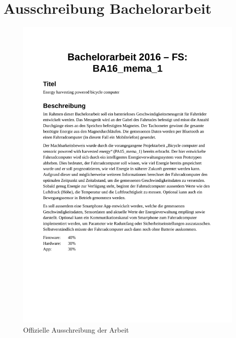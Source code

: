 
\appendix


% 
%
%
%
%


\chapter{Ausschreibung Bachelorarbeit}

\begin{figure}[h]
    \includegraphics {7Anhang/docs/Ausschreibung.pdf} 
     \caption{Offizielle Ausschreibung der Arbeit}\label{Ausschreibung} 
\end{figure}



